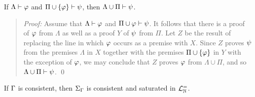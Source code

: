\begin{Lthm} \label{lemma:prcut}
  If $\Lambda \vdash \varphi$ and $\Pi\cup\lbrace\varphi\rbrace \vdash \psi$, then $\Lambda\cup\Pi \vdash \psi$. 
\end{Lthm}

\begin{quote} 
  \textit{Proof:} Assume that $\Lambda \vdash \varphi$ and $\Pi\cup{\ensuremath{\varphi}} \vdash \psi$.
  It follows that there is a proof of $\varphi$ from $\Lambda$ as well as a proof $Y$ of $\psi$ from $\Pi$. 
  Let $Z$ be the result of replacing the line in which $\varphi$ occurs as a premise with $X$.
  Since $Z$ proves $\psi$ from the premises $\Lambda$ in $X$ together with the premises $\Pi\cup\lbrace\varphi\rbrace$ in $Y$ with the exception of $\varphi$, we may conclude that $Z$ proves $\varphi$ from $\Lambda\cup\Pi$, and so $\Lambda\cup\Pi\vdash\psi$.
  \qed
\end{quote}





\begin{Lthm} \label{lemma:sat}
  If $\Gamma$ is consistent, then $\Sigma_{\Gamma}$ is consistent and saturated in $\mathcal{L}^{=}_{\mathbb{N}}$. 
\end{Lthm}


